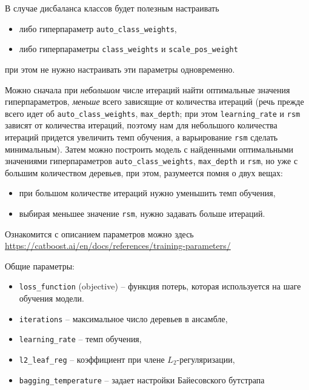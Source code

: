 \documentclass[%
	11pt,
	a4paper,
	utf8,
		]{article}
\begin{document}
В случае дисбаланса классов будет полезным настраивать
\begin{itemize}
	\item либо гиперпараметр \texttt{auto\_class\_weights},
	
	\item либо гиперпараметры \texttt{class\_weights} и \texttt{scale\_pos\_weight}
\end{itemize}
при этом не нужно настраивать эти параметры одновременно.

Можно сначала при \emph{небольшом} числе итераций найти оптимальные значения гиперпараметров, \emph{меньше} всего зависящие от количества итераций (речь прежде всего идет об \texttt{auto\_class\_weights}, \texttt{max\_depth}; при этом \texttt{learning\_rate} и \texttt{rsm} зависят от количества итераций, поэтому нам для небольшого количества итераций придется увеличить темп обучения, а варьирование \texttt{rsm} сделать минимальным). Затем можно построить модель с найденными оптимальными значениями гиперпараметров  \texttt{auto\_class\_weights}, \texttt{max\_depth} и \texttt{rsm}, но уже с большим количеством деревьев, при этом, разумеется помня о двух вещах:
\begin{itemize}
	\item при большом количестве итераций нужно уменьшить темп обучения,
	
	\item выбирая меньшее значение \texttt{rsm}, нужно задавать больше итераций.
\end{itemize}

Ознакомится с описанием параметров можно здесь \url{https://catboost.ai/en/docs/references/training-parameters/}

Общие параметры:
\begin{itemize}
	\item \verb|loss_function| (objective) -- функция потерь, которая используется на шаге обучения модели.
	
	\item \texttt{iterations} -- максимальное число деревьев в ансамбле,
	
	\item \verb*|learning_rate| -- темп обучения,
	
	\item \verb*|l2_leaf_reg| -- коэффициент при члене $ L_2 $-регуляризации,
	
	\item \verb*|bagging_temperature| -- задает настройки Байесовского бутстрапа
\end{itemize}
\end{document}

